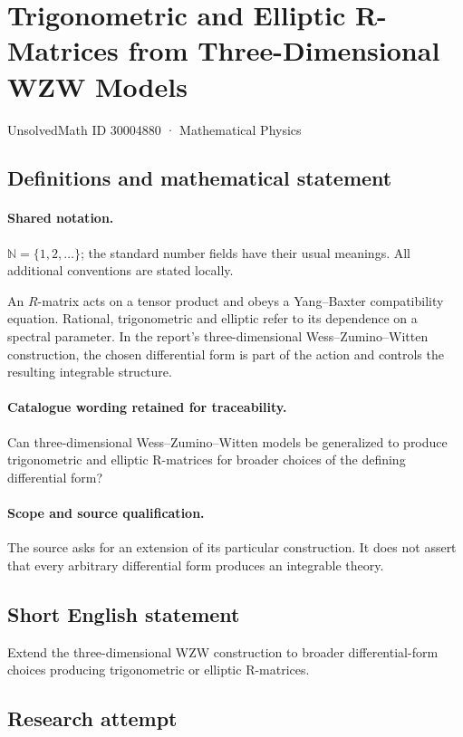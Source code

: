 \documentclass[11pt]{article}
\begin{document}
\setcounter{section}{30004879}
\section{Trigonometric and Elliptic R-Matrices from Three-Dimensional WZW Models}\label{30004880}
{\small UnsolvedMath ID 30004880 · Mathematical Physics}
\subsection{Definitions and mathematical statement}

\paragraph{Shared notation.}$\mathbb N=\{1,2,\ldots\}$; the standard number fields have their usual meanings. All additional conventions are stated locally.


An $R$-matrix acts on a tensor product and obeys a Yang--Baxter compatibility equation. Rational, trigonometric and elliptic refer to its dependence on a spectral parameter. In the report's three-dimensional Wess--Zumino--Witten construction, the chosen differential form is part of the action and controls the resulting integrable structure.

\paragraph{Catalogue wording retained for traceability.}
Can three-dimensional Wess–Zumino–Witten models be generalized to produce trigonometric and elliptic R-matrices for broader choices of the defining differential form?

\paragraph{Scope and source qualification.}The source asks for an extension of its particular construction. It does not assert that every arbitrary differential form produces an integrable theory.
\subsection{Short English statement}
Extend the three-dimensional WZW construction to broader differential-form choices producing trigonometric or elliptic R-matrices.
\subsection{Research attempt}
\end{document}
